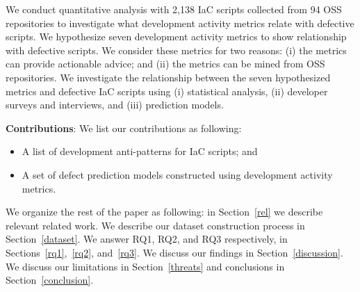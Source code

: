 \documentclass[smallextended]{svjour3}       %
\begin{document}
We conduct quantitative analysis with 2,138 IaC scripts collected from 94 OSS repositories to investigate what development activity metrics relate with defective scripts. We hypothesize seven development activity metrics to show relationship with defective scripts. We consider these metrics for two reasons: (i) the metrics can provide actionable advice; and (ii) the metrics can be mined from OSS repositories. We investigate the relationship between the seven hypothesized metrics and defective IaC scripts using (i) statistical analysis, (ii) developer surveys and interviews, and (iii) prediction models. 

\textbf{Contributions}: We list our contributions as following: 

\begin{itemize}[leftmargin=*]
\item{A list of development anti-patterns for IaC scripts}; and 
\item{A set of defect prediction models constructed using development activity metrics}. 
\end{itemize}


We organize the rest of the paper as following: in Section~\ref{rel} we describe relevant related work. We describe our dataset construction process in Section~\ref{dataset}. We answer RQ1, RQ2, and RQ3 respectively, in Sections~\ref{rq1},~\ref{rq2}, and~\ref{rq3}. We discuss our findings in Section~\ref{discussion}. We discuss our limitations in Section~\ref{threats} and conclusions in Section~\ref{conclusion}.



\end{document}
